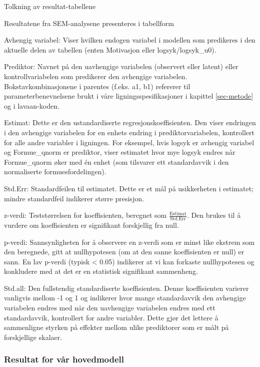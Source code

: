 \documentclass[
  12pt,
  a4paper,
  DIV=11,
  numbers=noendperiod]{scrartcl}
\begin{document}
Tolkning av resultat-tabellene

Resultatene fra SEM-analysene presenteres i tabellform

Avhengig variabel: Viser hvilken endogen variabel i modellen som
predikeres i den aktuelle delen av tabellen (enten Motivasjon eller
logsyk/logsyk\_u0).

Prediktor: Navnet på den uavhengige variabelen (observert eller latent)
eller kontrollvariabelen som predikerer den avhengige variabelen.
Bokstavkombinasjonene i parentes (f.eks. a1, b1) refererer til
parameterbenevnelsene brukt i våre ligningsspesifikasjoner i kapittel
\ref{sec-metode} og i lavaan-koden.

Estimat: Dette er den ustandardiserte regresjonskoeffisienten. Den viser
endringen i den avhengige variabelen for en enhets endring i
prediktorvariabelen, kontrollert for alle andre variabler i ligningen.
For eksempel, hvis logsyk er avhengig variabel og Formue\_qnorm er
prediktor, viser estimatet hvor mye logsyk endres når Formue\_qnorm øker
med én enhet (som tilsvarer ett standardavvik i den normaliserte
formuesfordelingen).

Std.Err: Standardfeilen til estimatet. Dette er et mål på usikkerheten i
estimatet; mindre standardfeil indikerer større presisjon.

z-verdi: Teststørrelsen for koeffisienten, beregnet som
\(\frac{\text{Estimat}}{\text{Std.Err}}\). Den brukes til å vurdere om
koeffisienten er signifikant forskjellig fra null.

p-verdi: Sannsynligheten for å observere en z-verdi som er minst like
ekstrem som den beregnede, gitt at nullhypotesen (om at den sanne
koeffisienten er null) er sann. En lav p-verdi (typisk \textless{} 0.05)
indikerer at vi kan forkaste nullhypotesen og konkludere med at det er
en statistisk signifikant sammenheng.

Std.all: Den fullstendig standardiserte koeffisienten. Denne
koeffisienten varierer vanligvis mellom -1 og 1 og indikerer hvor mange
standardavvik den avhengige variabelen endres med når den uavhengige
variabelen endres med ett standardavvik, kontrollert for andre
variabler. Dette gjør det lettere å sammenligne styrken på effekter
mellom ulike prediktorer som er målt på forskjellige skalaer.

\subsubsection{Resultat for vår
hovedmodell}\label{resultat-for-vuxe5r-hovedmodell}
\end{document}
